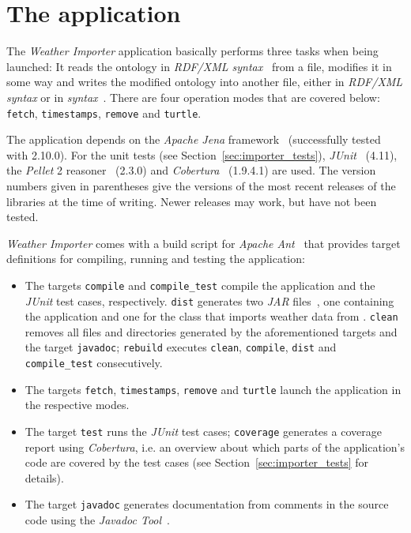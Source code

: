 \section{The application}
\label{sec:importer_application}

The \emph{Weather Importer} application basically performs three tasks when being launched: It reads the \smarthomeweather ontology in \emph{RDF/XML syntax}~\cite{RDF_XML} from a file, modifies it in some way and writes the modified ontology into another file, either in \emph{RDF/XML syntax} or in \emph{ syntax}~\cite{Turtle}. There are four operation modes that are covered below: \texttt{fetch}, \texttt{timestamps}, \texttt{remove} and \texttt{turtle}. %

The application depends on the \emph{Apache Jena} framework~\cite{apache_jena} (successfully tested with 2.10.0). For the unit tests (see Section~\ref{sec:importer_tests}), \emph{JUnit}~\cite{junit} (4.11), the \emph{Pellet}  2 reasoner~\cite{pellet} (2.3.0) and \emph{Cobertura}~\cite{cobertura} (1.9.4.1) are used. The version numbers given in parentheses give the versions of the most recent releases of the libraries at the time of writing. Newer releases may work, but have not been tested.

\emph{Weather Importer} comes with a build script for \emph{Apache Ant}~\cite{apache_ant} that provides target definitions for compiling, running and testing the application:

\begin{itemize}
  \item The targets \texttt{compile} and \texttt{compile\_test} compile the application and the \emph{JUnit} test cases, respectively. \texttt{dist} generates two \emph{JAR} files~\cite{jar}, one containing the application and one for the class that imports weather data from \yrno. \texttt{clean} removes all files and directories generated by the aforementioned targets and the target \texttt{javadoc}; \texttt{rebuild} executes \texttt{clean}, \texttt{compile}, \texttt{dist} and \texttt{compile\_test} consecutively.
  \item The targets \texttt{fetch}, \texttt{timestamps}, \texttt{remove} and \texttt{turtle} launch the application in the respective modes.
  \item The target \texttt{test} runs the \emph{JUnit} test cases; \texttt{coverage} generates a coverage report using \emph{Cobertura}, i.e. an overview about which parts of the application's code are covered by the test cases (see Section~\ref{sec:importer_tests} for details).
  \item The target \texttt{javadoc} generates documentation from comments in the source code using the \emph{Javadoc Tool}~\cite{javadoc}.
\end{itemize}

